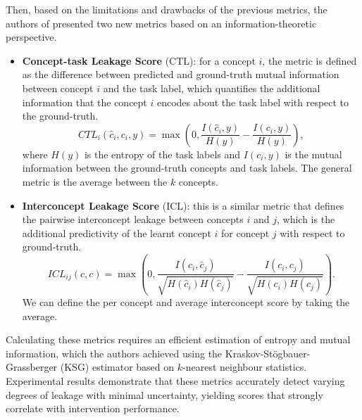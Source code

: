 Then, based on the limitations and drawbacks of the previous metrics, the authors of \cite{parisini2026leakageinterpretabilityconceptbasedmodels} presented two new metrics based on an information-theoretic perspective. 
\begin{itemize}
    \item \textbf{Concept-task Leakage Score} (CTL): for a concept $i$, the metric is defined as the difference between predicted and ground-truth mutual information between concept $i$ and the task label, which quantifies the additional information that the concept $i$ encodes about the task label with respect to the ground-truth. 
    \begin{equation}
        CTL_i (\hat c_i, c_i, y) = \max \left( 0, \frac{I(\hat c_i, y)}{H(y)} - \frac{I(c_i, y)}{H(y)} \right),
    \end{equation}
    where $H(y)$ is the entropy of the task labels and $I(c_i, y)$ is the mutual information between the ground-truth concepts and task labels. The general metric is the average between the $k$ concepts. 
    \item \textbf{Interconcept Leakage Score} (ICL): this is a similar metric that defines the pairwise interconcept leakage between concepts $i$ and $j$, which is the additional predictivity of the learnt concept $i$ for concept $j$ with respect to ground-truth. 
    \begin{equation}
        ICL_{ij}(\hat c, c) = \max \left( 0, \frac{I(\hat c_i, \hat c_j)}{\sqrt{H(\hat c_i)H(\hat c_j)}} - \frac{I(c_i,c_j)}{\sqrt{H(c_i)H(c_j)}} \right).
    \end{equation}
    We can define the per concept and average interconcept score by taking the average. 
\end{itemize}
Calculating these metrics requires an efficient estimation of entropy and mutual information, which the authors achieved using the Kraskov-Stögbauer-Grassberger (KSG) estimator based on $k$-nearest neighbour statistics. Experimental results demonstrate that these metrics accurately detect varying degrees of leakage with minimal uncertainty, yielding scores that strongly correlate with intervention performance. \\
